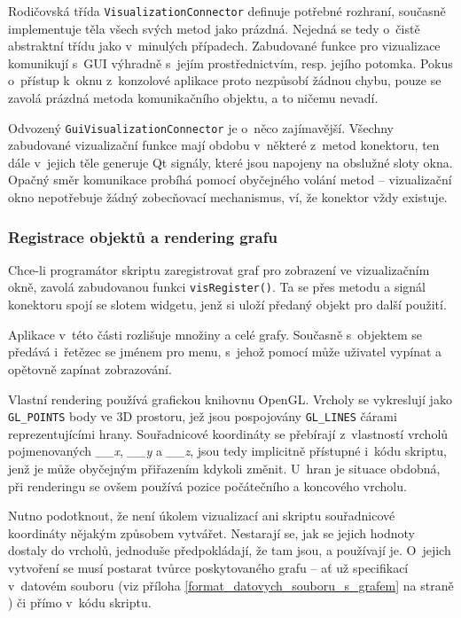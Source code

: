 \documentclass[11pt,twoside,a4paper]{book}
\begin{document}
Rodičovská třída \texttt{VisualizationConnector} definuje potřebné rozhraní, současně implementuje těla všech svých metod jako prázdná. Nejedná se tedy o~čistě abstraktní třídu jako v~minulých případech. Zabudované funkce pro vizualizace komunikují s~GUI výhradně s~jejím prostřednictvím, resp. jejího potomka. Pokus o~přístup k~oknu z~konzolové aplikace proto nezpůsobí žádnou chybu, pouze se zavolá prázdná metoda komunikačního objektu, a to ničemu nevadí.

Odvozený \texttt{GuiVisualizationConnector} je o~něco zajímavější. Všechny zabudované vizualizační funkce mají obdobu v~některé z~metod konektoru, ten dále v~jejich těle generuje Qt signály, které jsou napojeny na obslužné sloty okna. Opačný směr komunikace probíhá pomocí obyčejného volání metod -- vizualizační okno nepotřebuje žádný zobecňovací mechanismus, ví, že konektor vždy existuje.


\subsubsection{Registrace objektů a rendering grafu}

Chce-li programátor skriptu zaregistrovat graf pro zobrazení ve vizualizačním okně, zavolá zabudovanou funkci \texttt{visRegister()}. Ta se přes metodu a signál konektoru spojí se slotem widgetu, jenž si uloží předaný objekt pro další použití.

Aplikace v~této části rozlišuje množiny a celé grafy. Současně s~objektem se předává i~řetězec se jménem pro menu, s~jehož pomocí může uživatel vypínat a opětovně zapínat zobrazování.

Vlastní rendering používá grafickou knihovnu OpenGL. Vrcholy se vykreslují jako \texttt{GL\_POINTS} body ve 3D prostoru, jež jsou pospojovány \texttt{GL\_LINES} čárami reprezentujícími hrany. Sou\-řad\-ni\-co\-vé koordináty se přebírají z~vlastností vrcholů pojmenovaných \textit{\_\_x}, \textit{\_\_y} a \textit{\_\_z}, jsou tedy implicitně přístupné i~kódu skriptu, jenž je může obyčejným přiřazením kdykoli změnit. U~hran je situace obdobná, při renderingu se ovšem používá pozice počátečního a koncového vrcholu.

Nutno podotknout, že není úkolem vizualizací ani skriptu souřadnicové koordináty nějakým způsobem vytvářet. Nestarají se, jak se jejich hodnoty dostaly do vrcholů, jednoduše před\-po\-klá\-da\-jí, že tam jsou, a používají je. O~jejich vytvoření se musí postarat tvůrce poskytovaného grafu -- ať už specifikací v~datovém souboru (viz příloha \ref{format_datovych_souboru_s_grafem} na straně \pageref{format_datovych_souboru_s_grafem}) či přímo v~kódu skriptu.
\end{document}
